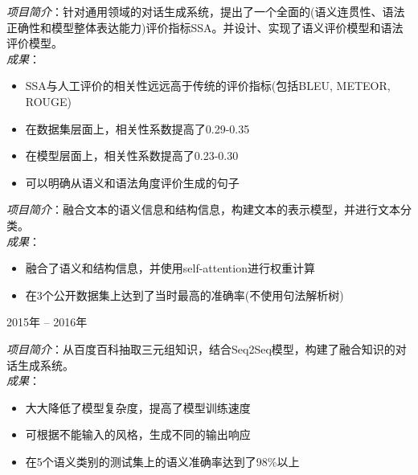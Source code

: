 \documentclass{resume}
\begin{document}
\begin{onehalfspacing}
\emph{项目简介}：针对通用领域的对话生成系统，提出了一个全面的(语义连贯性、语法正确性和模型整体表达能力)评价指标SSA。并设计、实现了语义评价模型和语法评价模型。\\
\emph{成果}：
\begin{itemize}
  \item SSA与人工评价的相关性远远高于传统的评价指标(包括BLEU, METEOR, ROUGE)
  \item 在数据集层面上，相关性系数提高了0.29-0.35
  \item 在模型层面上，相关性系数提高了0.23-0.30
  \item 可以明确从语义和语法角度评价生成的句子
\end{itemize}
\end{onehalfspacing}

\begin{onehalfspacing}
\emph{项目简介}：融合文本的语义信息和结构信息，构建文本的表示模型，并进行文本分类。\\
\emph{成果}：
\begin{itemize}
  \item 融合了语义和结构信息，并使用self-attention进行权重计算
  \item 在3个公开数据集上达到了当时最高的准确率(不使用句法解析树)
\end{itemize}
\end{onehalfspacing}

 {2015年 -- 2016年}
\begin{onehalfspacing}
\emph{项目简介}：从百度百科抽取三元组知识，结合Seq2Seq模型，构建了融合知识的对话生成系统。\\
\emph{成果}：
\begin{itemize}
  \item 大大降低了模型复杂度，提高了模型训练速度
  \item 可根据不能输入的风格，生成不同的输出响应
  \item 在5个语义类别的测试集上的语义准确率达到了98\%以上
\end{itemize}
\end{onehalfspacing}
\end{document}

